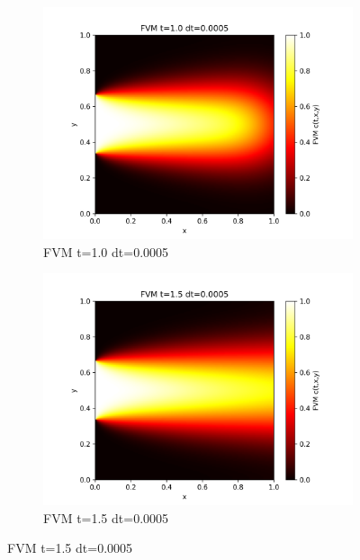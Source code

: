 \documentclass[11pt,a4 paper,one side]{article}
\begin{document}
\begin{figure}[htbp]
    \vspace{0.0cm}  %
    
    \begin{subfigure}{0.45\textwidth}
        \includegraphics[width=\textwidth]{FVM t=1.0 dt=0.0005.png}
        \caption{FVM t=1.0 dt=0.0005}
        \label{FVM t=1.0 dt=0.0005}
    \end{subfigure}
    \hfill
    \begin{subfigure}{0.45\textwidth}
        \includegraphics[width=\textwidth]{FVM t=1.5 dt=0.0005.png}
        \caption{FVM t=1.5 dt=0.0005}
        \label{FVM t=1.5 dt=0.0005}
    \end{subfigure}
    
    \vspace{0.1cm}  %


\end{figure}
\end{document}
